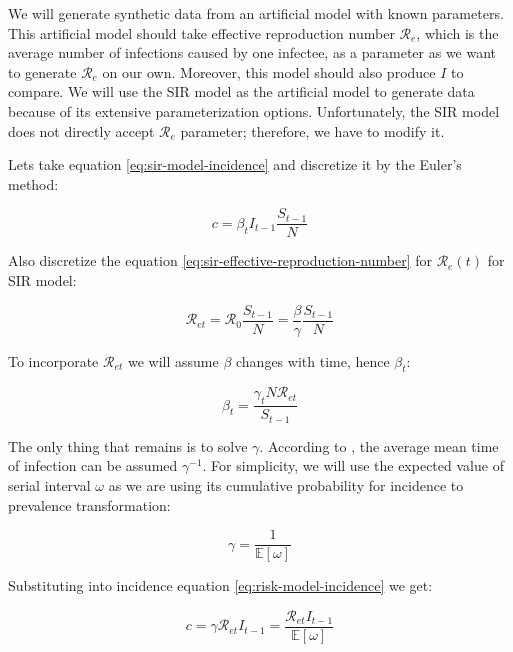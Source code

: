\documentclass[
  digital, %
  oneside, %
  lof,     %
  lot,     %
]{fithesis4}
\begin{document}
We will generate synthetic data from an artificial model with known parameters.
This artificial model should take effective reproduction number $\mathcal{R}_e$, which is the average number of infections caused by one infectee, as a parameter as we want to generate $\mathcal{R}_e$ on our own.
Moreover, this model should also produce $I$ to compare.
We will use the SIR model as the artificial model to generate data because of its extensive parameterization options. Unfortunately, the SIR model does not directly accept $\mathcal{R}_e$ parameter; therefore, we have to modify it.

Lets take equation \eqref{eq:sir-model-incidence} and discretize it by the Euler's method:

\begin{equation}
  \label{eq:risk-model-incidence}
  c = \beta_t I_{t-1} \frac{S_{t-1}}{N}
\end{equation}

Also discretize the equation \eqref{eq:sir-effective-reproduction-number} for $\mathcal{R}_e(t)$ for SIR model:

\begin{equation}\label{eq:risk-model-rt}
  \mathcal{R}_{et} = \mathcal{R}_0 \frac{S_{t-1}}{N} = \frac{\beta}{\gamma} \frac{S_{t-1}}{N}
\end{equation}

To incorporate $\mathcal{R}_{et}$ we will assume $\beta$ changes with time, hence $\beta_t$:

\begin{equation}
\beta_t = \frac{\gamma_t N \mathcal{R}_{et}}{S_{t-1}}
\end{equation}

The only thing that remains is to solve $\gamma$. According to \cite{ma2019}, the average mean time of infection can be assumed $\gamma^{-1}$.
For simplicity, we will use the expected value of serial interval $\omega$ as we are using its cumulative probability for incidence to prevalence transformation:

\begin{equation}
  \gamma = \frac{1}{\mathbb{E}[\omega]}
\end{equation}

\noindent
Substituting into incidence equation \eqref{eq:risk-model-incidence} we get:

\begin{equation}
  c = \gamma \mathcal{R}_{et} I_{t-1} = \frac{\mathcal{R}_{et} I_{t-1}}{\mathbb{E}[\omega]}
\end{equation}
\end{document}
